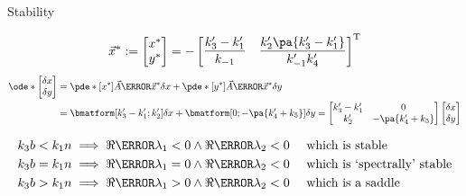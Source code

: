 \documentclass[aspectratio=169,  notheorems, sOuRcEs]{RUCPresentation}
\begin{document}
\begin{frame}{Stability}

\begin{equation*}
    \vec{x}^*:=
    \left[ \begin{matrix} x^* \\ y^* \end{matrix} \right]
    =
    -
    \left[
        \begin{matrix}
            \displaystyle {k'_3 - k'_1 \over k_{-1} }  &
            \displaystyle { k'_2\pa{k'_3 - k'_1} \over k'_{-1} k'_4}
        \end{matrix}
    \right]^{\mathrm{T}}
\end{equation*}
\begin{align*}
    \ode* \left[\begin{matrix} \delta x \\ \delta y \end{matrix} \right]
    &=
    \pde*[\bgroup x^*\egroup] \vec{A}\of{\vec{x}^*} \delta x +
    \pde*[\bgroup y^*\egroup] \vec{A}\of{\vec{x}^*} \delta y \\
    &= \bmatform[ k'_3 - k'_1 ; k'_2 ] \delta x
    +  \bmatform[ 0; -\pa{k'_4 + k_5}] \delta y
    =
    \left[
        \begin{matrix}
            k'_3  - k'_1  & 0\\
            k'_2 & -\pa{k'_4 + k_5}
        \end{matrix}
    \right]
    \left[\begin{matrix} \delta x \\ \delta y \end{matrix} \right]
\end{align*}

\begin{align*}
    k_3 b < k_1 n &\implies \Re\of{\lambda_{1}} < 0\land \Re\of{\lambda_2} < 0
                  &&\text{ which is stable} \\
    k_3 b = k_1 n &\implies \Re\of{\lambda_{1}} = 0\land \Re\of{\lambda_2} < 0
                  &&\text{ which is `spectrally' stable}\\
    k_3 b > k_1 n &\implies \Re\of{\lambda_{1}} > 0 \land \Re\of{\lambda_{2}} < 0
                  &&\text{ which is a saddle}
\end{align*}

\end{frame}
\end{document}
